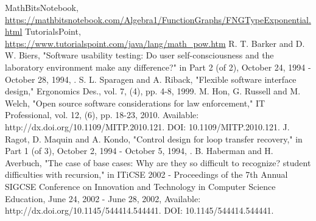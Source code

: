 \documentclass[a4paper, 11pt]{article}
\begin{document}
\begin{thebibliography}{9}
MathBitsNotebook,\\
\url{https://mathbitsnotebook.com/Algebra1/FunctionGraphs/FNGTypeExponential.html}
TutorialsPoint,\\
\url{https://www.tutorialspoint.com/java/lang/math_pow.htm}
 R. T. Barker and D. W. Biers,   "Software usability testing: Do user self-consciousness and the laboratory environment make any difference?" in Part 2 (of 2), October 24, 1994 - October 28, 1994, .
  S. L. Sparagen and A. Riback, "Flexible software interface design," Ergonomics Des., vol. 7, (4), pp. 4-8, 1999.
 M. Hon, G. Russell and M. Welch, "Open source software considerations for law enforcement," IT Professional, vol. 12, (6), pp. 18-23, 2010. Available: http://dx.doi.org/10.1109/MITP.2010.121. DOI: 10.1109/MITP.2010.121.
 J. Ragot, D. Maquin and A. Kondo, "Control design for loop transfer recovery," in Part 1 (of 3), October 2, 1994 - October 5, 1994, .
 B. Haberman and H. Averbuch, "The case of base cases: Why are they so difficult to recognize? student difficulties with recursion," in ITiCSE 2002 - Proceedings of the 7th Annual SIGCSE Conference on Innovation and Technology in Computer Science Education, June 24, 2002 - June 28, 2002, Available: http://dx.doi.org/10.1145/544414.544441. DOI: 10.1145/544414.544441.
\end{thebibliography}
\end{document}
